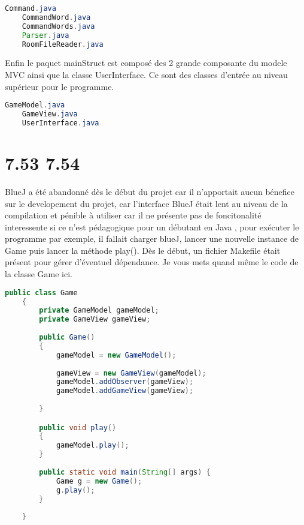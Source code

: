 \documentclass[a4paper , 10pt]{article}
\begin{document}
\begin{lstlisting}[language=Java, caption={pkg\_tools}]
    Command.java  
    CommandWord.java  
    CommandWords.java  
    Parser.java  
    RoomFileReader.java
\end{lstlisting}

Enfin le paquet mainStruct est composé des 2 grande composante du modele MVC ainsi que la classe UserInterface.
Ce sont des classes d'entrée au niveau supérieur pour le programme.
\begin{lstlisting}[language=Java, caption={pkg\_commands}]
    GameModel.java  
    GameView.java  
    UserInterface.java
\end{lstlisting}


\section{7.53 7.54}
BlueJ a été abandonné dès le début du projet car il n'apportait aucun bénefice sur le developement du projet,
 car l'interface BlueJ était lent au niveau de la compilation et pénible à utiliser car il ne présente pas de foncitonalité interessente si ce n'est pédagogique pour un débutant en Java
 , pour exécuter le programme par exemple, il fallait charger blueJ,
 lancer une nouvelle instance de Game puis lancer la méthode play(). Dès le début, un fichier Makefile était présent pour gérer d'éventuel dépendance.
Je vous mets quand même le code de la classe Game ici.

\begin{lstlisting}[language=Java, caption={Game}]
    public class Game 
    {
        private GameModel gameModel;
        private GameView gameView;
    
        public Game() 
        {
            gameModel = new GameModel();
            
            gameView = new GameView(gameModel);
            gameModel.addObserver(gameView);
            gameModel.addGameView(gameView);
    
        }

        public void play() 
        {            
            gameModel.play();    
        }
    
        public static void main(String[] args) {
            Game g = new Game();
            g.play();
        }
    
    }
\end{lstlisting}
\end{document}
